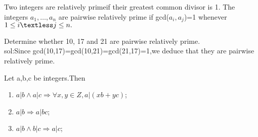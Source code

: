 \documentclass[cn,10pt,math=newtx,citestyle=gb7714-2015,bibstyle=gb7714-2015]{elegantbook}
\begin{document}
\begin{definition}
    Two integers are relatively primeif their greatest common divisor is 1. The integers $a_1,…,a_n$ are pairwise relatively prime if gcd($a_i, a_j$)=1 whenever $ 1 \leq i \textless j \leq n.$
\end{definition}

\begin{example}
    Determine whether 10, 17 and 21 are pairwise
relatively prime.\\
sol:Since gcd(10,17)=gcd(10,21)=gcd(21,17)=1,we deduce that they are pairwise relatively prime.
\end{example}
\begin{theorem}
    Let a,b,c be integers.Then
    \begin{enumerate}
        \item $a|b \land a|c \Rightarrow \forall x,y\in Z,a|(xb+yc)$;
        \item $ a|b\Rightarrow a|bc$;
        \item $a|b\land b|c\Rightarrow a|c$;
    \end{enumerate}
\end{theorem}
\end{document}
